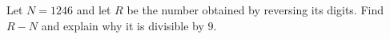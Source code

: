 Let $N=1246$ and let $R$ be the number obtained by reversing its digits. Find $R-N$ and explain why it is divisible by $9$.

